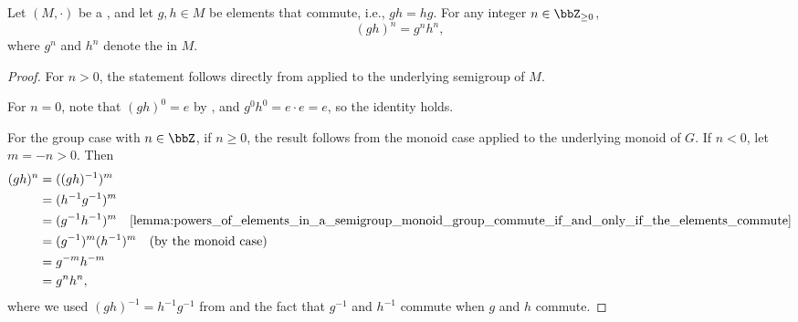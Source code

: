 \begin{lemma} \label{lemma:power_of_product_of_commuting_elements_in_a_monoid}
    Let $(M,\cdot)$ be a , and let $g, h \in M$ be elements that commute, i.e., $gh = hg$. For any integer $n \in \bbZ_{\geq 0}$,
    $$(gh)^n = g^n h^n,$$
    where $g^n$ and $h^n$ denote the  in $M$.
\end{lemma}

\begin{proof}
    For $n > 0$, the statement follows directly from  applied to the underlying semigroup of $M$.

    For $n = 0$, note that $(gh)^0 = e$ by , and $g^0 h^0 = e \cdot e = e$, so the identity holds.

    For the group case with $n \in \bbZ$, if $n \ge 0$, the result follows from the monoid case applied to the underlying monoid of $G$. If $n < 0$, let $m = -n > 0$. Then
    \begin{align*}
        (gh)^n &= ((gh)^{-1})^m \\
        &= (h^{-1} g^{-1})^m \\
        &= (g^{-1} h^{-1})^m \quad\text{\Cref{lemma:powers_of_elements_in_a_semigroup_monoid_group_commute_if_and_only_if_the_elements_commute}} \\
        &= (g^{-1})^m (h^{-1})^m \quad\text{(by the monoid case)} \\
        &= g^{-m} h^{-m} \\
        &= g^n h^n,
    \end{align*}
    where we used $(gh)^{-1} = h^{-1} g^{-1}$ from  and the fact that $g^{-1}$ and $h^{-1}$ commute when $g$ and $h$ commute.
\end{proof}